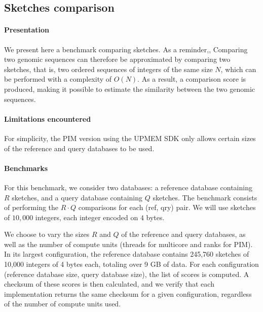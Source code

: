 \subsection{Sketches comparison}
\label{sec:mash}

\paragraph{Presentation}

We present here a benchmark comparing sketches.
As a reminder,, 
Comparing two genomic sequences can therefore be approximated by comparing two sketches, that is, two ordered sequences of integers of the same size $N$,
which can be performed with a complexity of $O(N)$. 
As a result, a comparison score is produced, making it possible to estimate the similarity between the two genomic sequences.

\paragraph{Limitations encountered} 
For simplicity, the PIM version using the UPMEM SDK only allows certain sizes of the reference and query databases to be used.

\paragraph{Benchmarks} 
For this benchmark, we consider two databases: a reference database containing $R$ sketches, and a query database containing $Q$ sketches. The benchmark consists of performing the $R \cdot Q$ comparisons for each (ref, qry) pair. 
We will use sketches of $10,000$ integers, each integer encoded on $4$ bytes.

We choose to vary the sizes $R$ and $Q$ of the reference and query databases, as well as the number of compute units (threads for multicore and ranks for PIM).
In its largest configuration, the reference database contains 245,760 sketches of 10,000 integers of 4 bytes each, totaling over 9 GB of data.
For each configuration (reference database size, query database size), the list of scores is computed. A checksum of these scores is then calculated, and we verify that each implementation returns the same checksum for a given configuration, regardless of the number of compute units used.

